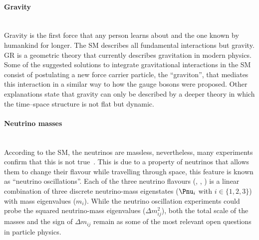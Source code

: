 


\paragraph{Gravity}\mbox{}\\
Gravity is the first force that any person learns about and the one known by humankind for longer. 
The SM describes all fundamental interactions but gravity. %
GR is a geometric theory that currently describes gravitation in modern physics.
Some of the suggested solutions to integrate gravitational interactions in the SM consist of
postulating a new force carrier particle, the ``graviton'', that mediates this interaction in a similar way to how the gauge bosons
were proposed. Other explanations state that gravity can only be described by a deeper theory in which the 
time--space structure is not flat but dynamic. 

\paragraph{Neutrino masses}\mbox{}\\
According to the SM, the neutrinos are massless, nevertheless, many experiments confirm that this is not 
true~\cite{KATRIN:2021uub}. This is due to a property of neutrinos that allows them to change their flavour 
while travelling through space, this feature is known as ``neutrino oscillations''. Each of the three neutrino flavours
(\Pnue, \Pnum, \Pnut)
is a linear combination of three discrete neutrino-mass eigenstates ($\Pnu_{i}$ with $i\in\{1,2,3\}$) with mass eigenvalues 
($m_i$). While the neutrino oscillation experiments could probe the squared neutrino-mass eigenvalues 
($\Delta m^{2}_{ij}$), both the total scale of the masses and the sign of $\Delta m_{ij}$ remain as some of the most 
relevant open questions in particle physics. %


